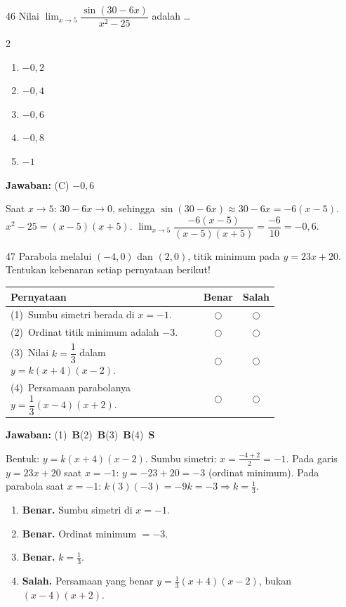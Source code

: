 \documentclass[11pt]{article}
\newcommand{\jawaban}[1]{%
  \noindent\colorbox{gold!30}{\parbox{\dimexpr\linewidth-2\fboxsep\relax}{%
    \textbf{Jawaban:} #1}}\par\smallskip}
\newenvironment{pilB}{%
  \par\smallskip\begin{multicols}{2}
  \begin{enumerate}[label=(\Alph*),leftmargin=*,itemsep=1pt,topsep=3pt]}%
  {\end{enumerate}\end{multicols}}
\begin{document}
\begin{soal}{46}
Nilai $\displaystyle\lim_{x\to5}\dfrac{\sin(30-6x)}{x^2-25}$ adalah \ldots
\begin{pilB}\item $-0{,}2$\item $-0{,}4$\item $-0{,}6$\item $-0{,}8$\item $-1$\end{pilB}
\end{soal}
\begin{pembox}
\jawaban{(C) $-0{,}6$}
Saat $x\to5$: $30-6x\to0$, sehingga $\sin(30-6x)\approx30-6x=-6(x-5)$.
$x^2-25=(x-5)(x+5)$.
$\displaystyle\lim_{x\to5}\dfrac{-6(x-5)}{(x-5)(x+5)}=\dfrac{-6}{10}=-0{,}6$.
\end{pembox}

\begin{soal}{47}
Parabola melalui $(-4,0)$ dan $(2,0)$, titik minimum pada $y=23x+20$.
Tentukan kebenaran setiap pernyataan berikut!

\par\smallskip
{\renewcommand{\arraystretch}{1.4}%
\begin{tabular}{@{}p{0.76\linewidth}cc@{}}
\hline\textbf{Pernyataan}&\textbf{Benar}&\textbf{Salah}\\\hline
(1)~Sumbu simetri berada di $x=-1$.&$\bigcirc$&$\bigcirc$\\
(2)~Ordinat titik minimum adalah $-3$.&$\bigcirc$&$\bigcirc$\\
(3)~Nilai $k=\dfrac{1}{3}$ dalam $y=k(x+4)(x-2)$.&$\bigcirc$&$\bigcirc$\\
(4)~Persamaan parabolanya $y=\dfrac{1}{3}(x-4)(x+2)$.&$\bigcirc$&$\bigcirc$\\\hline
\end{tabular}}
\end{soal}
\begin{pembox}
\jawaban{(1)~\textbf{B}\quad(2)~\textbf{B}\quad(3)~\textbf{B}\quad(4)~\textbf{S}}
Bentuk: $y=k(x+4)(x-2)$. Sumbu simetri: $x=\tfrac{-4+2}{2}=-1$.
Pada garis $y=23x+20$ saat $x=-1$: $y=-23+20=-3$ (ordinat minimum).
Pada parabola saat $x=-1$: $k(3)(-3)=-9k=-3\Rightarrow k=\tfrac13$.
\begin{enumerate}[leftmargin=*,topsep=2pt,itemsep=2pt]
\item \textbf{Benar.} Sumbu simetri di $x=-1$.
\item \textbf{Benar.} Ordinat minimum $=-3$.
\item \textbf{Benar.} $k=\tfrac13$.
\item \textbf{Salah.} Persamaan yang benar $y=\tfrac13(x+4)(x-2)$, bukan $(x-4)(x+2)$.
\end{enumerate}
\end{pembox}
\end{document}
